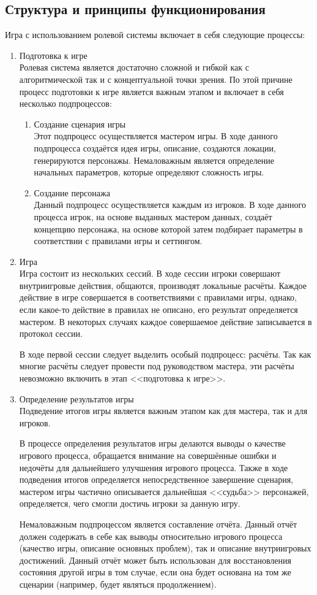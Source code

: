 \subsection{Структура и принципы функционирования}

Игра с использованием ролевой системы \dnd включает в себя следующие процессы:
\begin{enumerate}
\item Подготовка к игре\\
Ролевая система \dnd является достаточно сложной и гибкой как с алгоритмической так и с концептуальной точки зрения. По этой причине процесс подготовки к игре является важным этапом и включает в себя несколько подпроцессов:
\begin{enumerate}
\item Создание сценария игры\\
Этот подпроцесс осуществляется мастером игры. В ходе данного подпроцесса создаётся идея игры, описание, создаются локации, генерируются персонажы. Немаловажным является определение начальных параметров, которые определяют сложность игры.
\item Создание персонажа\\
Данный подпроцесс осуществляется каждым из игроков. В ходе данного процесса игрок, на основе выданных мастером данных, создаёт концепцию персонажа, на основе которой затем подбирает параметры в соответствии с правилами игры и сеттингом.
\end{enumerate}
\item Игра\\
Игра состоит из нескольких сессий. В ходе сессии игроки совершают внутриигровые действия, общаются, производят локальные расчёты. Каждое действие в игре совершается в соответствиями с правилами игры, однако, если какое-то действие в правилах не описано, его результат определяется мастером. В некоторых случаях каждое совершаемое действие записывается в протокол сессии.

В ходе первой сессии следует выделить особый подпроцесс: расчёты. Так как многие расчёты следует провести под руководством мастера, эти расчёты невозможно включить в этап <<подготовка к игре>>.
\item Определение результатов игры\\
Подведение итогов игры является важным этапом как для мастера, так и для игроков.

В процессе определения результатов игры делаются выводы о качестве игрового процесса, обращается внимание на совершённые ошибки и недочёты для дальнейшего улучшения игрового процесса. Также в ходе подведения итогов определяется непосредственное завершение сценария, мастером игры частично описывается дальнейшая <<судьба>> персонажей, определяется, чего смогли достичь игроки за данную игру.

Немаловажным подпроцессом является составление отчёта. Данный отчёт должен содержать в себе как выводы относительно игрового процесса (качество игры, описание основных проблем), так и описание внутриигровых достижений. Данный отчёт может быть использован для восстановления состояния другой игры в том случае, если она будет основана на том же сценарии (например, будет являться продолжением).
\end{enumerate}

